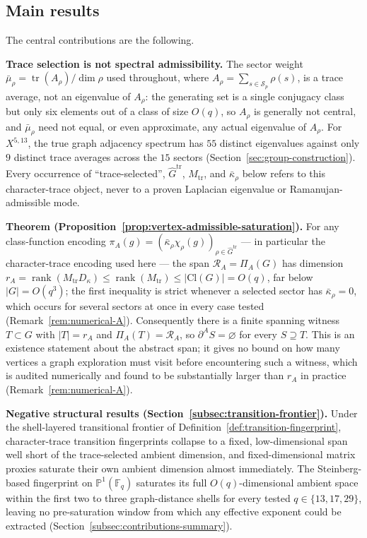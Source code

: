 \documentclass[11pt,a4paper]{article}
\theoremstyle{plain}
\theoremstyle{definition}
\theoremstyle{remark}
\newcommand{\F}{\mathbb{F}}
\newcommand{\Cl}{\mathrm{Cl}}
\newcommand{\rank}{\operatorname{rank}}
\newcommand{\adm}{\mathrm{tr}}
\newcommand{\Gadm}{\widehat{G}^{\adm}}
\newcommand{\Madm}{M_{\adm}}
\newcommand{\dA}{\partial^A}
\newcommand{\kap}{\bar\kappa_\rho}
\newcommand{\mubar}{\bar\mu_\rho}
\DeclareMathOperator{\tr}{tr}
\newcommand{\piA}{\pi_A}
\begin{document}
    \subsection{Main results}

      The central contributions are the following.

      \textbf{Trace selection is not spectral admissibility.}
      The sector weight $\mubar = \tr(A_\rho)/\dim\rho$ used throughout, where
      $A_\rho = \sum_{s\in\mathcal S_p}\rho(s)$, is a trace average, not an eigenvalue of $A_\rho$: the
      generating set is a single conjugacy class but only six elements out of a class of size $O(q)$,
      so $A_\rho$ is generally not central, and $\mubar$ need not equal, or even approximate, any
      actual eigenvalue of $A_\rho$.
      For $X^{5,13}$, the true graph adjacency spectrum has $55$ distinct eigenvalues against only
      $9$ distinct trace averages across the $15$ sectors (Section~\ref{sec:group-construction}).
      Every occurrence of ``trace-selected'', $\Gadm$, $\Madm$, and $\kap$ below refers to this
      character-trace object, never to a proven Laplacian eigenvalue or Ramanujan-admissible mode.

      \textbf{Theorem (Proposition~\ref{prop:vertex-admissible-saturation}).}
      For any class-function encoding $\piA(g) = (\kap\chi_\rho(g))_{\rho\in\Gadm}$ --- in particular
      the character-trace encoding used here --- the span $\mathcal{R}_A = \Pi_A(G)$ has dimension
      $r_A = \rank(\Madm D_\kappa) \le \rank(\Madm) \le |\Cl(G)| = O(q)$, far below $|G| = O(q^3)$; the
      first inequality is strict whenever a selected sector has $\kap = 0$, which occurs for
      several sectors at once in every case tested (Remark~\ref{rem:numerical-A}).
      Consequently there is a finite spanning witness $T \subset G$ with $|T| = r_A$ and
      $\Pi_A(T) = \mathcal{R}_A$, so $\dA S = \varnothing$ for every $S \supseteq T$.
      This is an existence statement about the abstract span; it gives no bound on how
      many vertices a graph exploration must visit before encountering such a witness, which is
      audited numerically and found to be substantially larger than $r_A$ in practice
      (Remark~\ref{rem:numerical-A}).

      \textbf{Negative structural results (Section~\ref{subsec:transition-frontier}).}
      Under the shell-layered transitional frontier of
      Definition~\ref{def:transition-fingerprint}, character-trace transition fingerprints collapse
      to a fixed, low-dimensional span well short of the trace-selected ambient dimension, and
      fixed-dimensional matrix proxies saturate their own ambient dimension almost immediately.
      The Steinberg-based fingerprint on $\mathbb{P}^1(\F_q)$ saturates its full $O(q)$-dimensional
      ambient space within the first two to three graph-distance shells for every tested
      $q \in \{13,17,29\}$, leaving no pre-saturation window from which any effective exponent could
      be extracted (Section~\ref{subsec:contributions-summary}).
\end{document}
